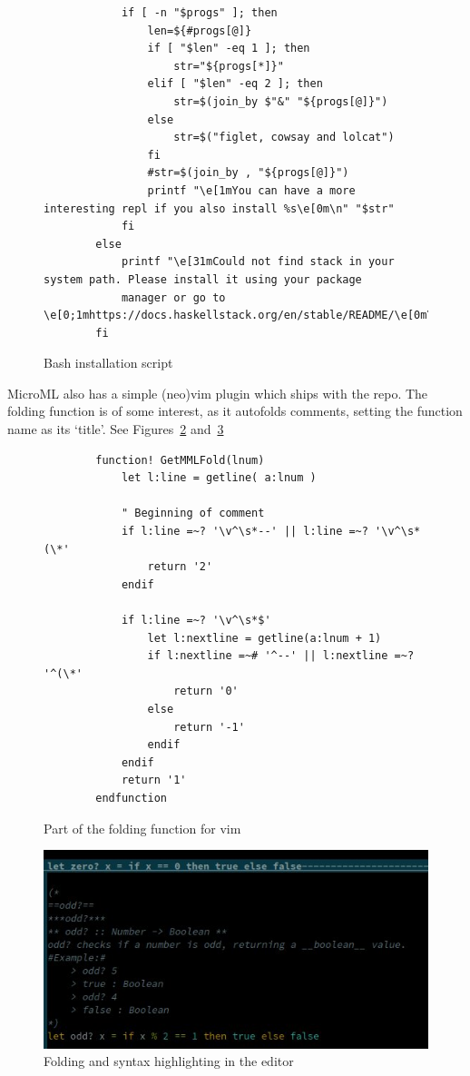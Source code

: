 \begin{figure}
\begin{verbatim}
            if [ -n "$progs" ]; then
                len=${#progs[@]}
                if [ "$len" -eq 1 ]; then
                    str="${progs[*]}"
                elif [ "$len" -eq 2 ]; then
                    str=$(join_by $"&" "${progs[@]}")
                else 
                    str=$("figlet, cowsay and lolcat")
                fi
                #str=$(join_by , "${progs[@]}")
                printf "\e[1mYou can have a more interesting repl if you also install %s\e[0m\n" "$str"
            fi
        else 
            printf "\e[31mCould not find stack in your system path. Please install it using your package
            manager or go to \e[0;1mhttps://docs.haskellstack.org/en/stable/README/\e[0m\n"
        fi
    \end{verbatim}
    \caption{Bash installation script}
\label{fig:installation}
\end{figure}

MicroML also has a simple (neo)vim plugin which ships with the repo. The folding function is of some
interest, as it autofolds comments, setting the function name as its `title'. See
Figures~\ref{fig:fold} and~\ref{fig:foldVim}

\begin{figure}
    \begin{verbatim}
        function! GetMMLFold(lnum) 
            let l:line = getline( a:lnum )

            " Beginning of comment
            if l:line =~? '\v^\s*--' || l:line =~? '\v^\s*(\*'
                return '2'
            endif

            if l:line =~? '\v^\s*$'
                let l:nextline = getline(a:lnum + 1)
                if l:nextline =~# '^--' || l:nextline =~? '^(\*'
                    return '0'
                else
                    return '-1'
                endif
            endif
            return '1'
        endfunction 
    \end{verbatim}
    \caption{Part of the folding function for vim}
\label{fig:fold}
\end{figure}

\begin{figure}
    \includegraphics[width=\textwidth]{images/vim.jpg}
    {\caption{Folding and syntax highlighting in the editor}}
\label{fig:foldVim}
\end{figure}
